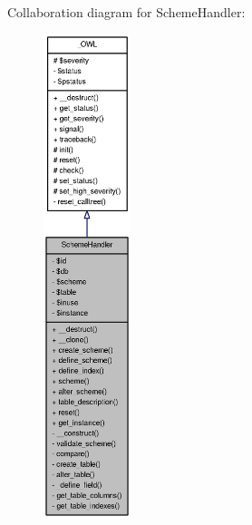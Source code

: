 Collaboration diagram for SchemeHandler:\nopagebreak
\begin{figure}[H]
\begin{center}
\leavevmode
\includegraphics[height=400pt]{classSchemeHandler__coll__graph}
\end{center}
\end{figure}
